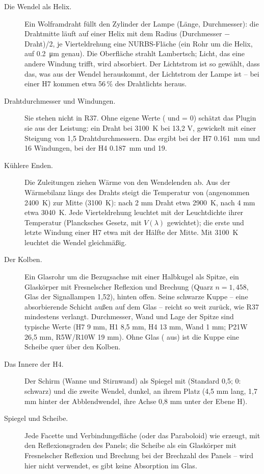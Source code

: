 \begin{description}
  \item[Die Wendel als Helix.] Ein Wolframdraht füllt den Zylinder der Lampe (Länge, Durchmesser):
    die Drahtmitte läuft auf einer Helix mit dem Radius (Durchmesser $-$ Draht)/2, je Vierteldrehung
    eine NURBS-Fläche (ein Rohr um die Helix, auf \qty{0.2}{\micro\metre} genau). Die Oberfläche
    strahlt Lambertsch; Licht, das eine andere Windung trifft, wird absorbiert. Der Lichtstrom ist so
    gewählt, dass das, was aus der Wendel herauskommt, der Lichtstrom der Lampe ist -- bei einer H7
    kommen etwa 56\,\% des Drahtlichts heraus.
  \item[Drahtdurchmesser und Windungen.] Sie stehen nicht in R37. Ohne eigene Werte
    ( und  = 0) schätzt das Plugin sie aus der Leistung:
    ein Draht bei \qty{3100}{K} bei 13,2 V, gewickelt mit einer Steigung von 1,5 Drahtdurchmessern.
    Das ergibt bei der H7 \qty{0.161}{mm} und 16 Windungen, bei der H4 \qty{0.187}{mm} und 19.
  \item[Kühlere Enden.] Die Zuleitungen ziehen Wärme von den Wendelenden ab. Aus der
    Wärmebilanz längs des Drahts steigt die Temperatur von 
    (angenommen \qty{2400}{K}) zur Mitte (\qty{3100}{K}): nach 2 mm Draht etwa \qty{2900}{K}, nach
    4 mm etwa \qty{3040}{K}. Jede Vierteldrehung leuchtet mit der Leuchtdichte ihrer Temperatur
    (Plancksches Gesetz, mit $V(\lambda)$ gewichtet); die erste und letzte Windung einer H7 etwa mit
    der Hälfte der Mitte. Mit \qty{3100}{K} leuchtet die Wendel gleichmäßig.
  \item[Der Kolben.] Ein Glasrohr um die Bezugsachse mit einer Halbkugel als Spitze, ein Glaskörper
    mit Fresnelscher Reflexion und Brechung (Quarz $n = 1{,}458$, Glas der Signallampen 1,52), hinten
    offen. Seine schwarze Kuppe -- eine absorbierende Schicht außen auf dem Glas -- reicht so weit
    zurück, wie R37 mindestens verlangt. Durchmesser, Wand und Lage der Spitze sind typische Werte
    (H7 9 mm, H1 8,5 mm, H4 13 mm, Wand 1 mm; P21W 26,5 mm, R5W/R10W 19 mm). Ohne Glas
    ( aus) ist die Kuppe eine Scheibe quer über den Kolben.
  \item[Das Innere der H4.] Der Schirm (Wanne und Stirnwand) als Spiegel mit
     (Standard 0,5; 0: schwarz) und die zweite Wendel, dunkel, an ihrem
    Platz (4,5 mm lang, 1,7 mm hinter der Abblendwendel, ihre Achse 0,8 mm unter der Ebene H).
  \item[Spiegel und Scheibe.] Jede Facette und Verbindungsfläche (oder das Paraboloid) wie erzeugt,
    mit den Reflexionsgraden des Panels; die Scheibe als ein Glaskörper mit Fresnelscher Reflexion und
    Brechung bei der Brechzahl des Panels --  wird hier nicht verwendet, es gibt
    keine Absorption im Glas.
\end{description}

